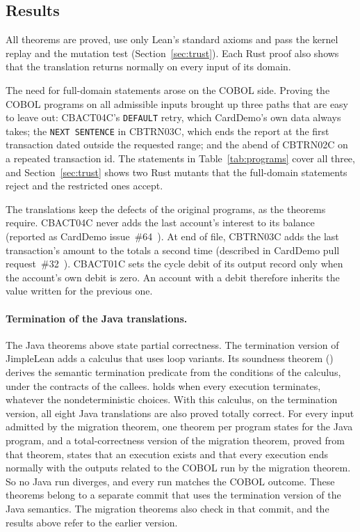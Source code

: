 \subsection{Results}

All \aTheorems{} theorems are proved, use only Lean's standard axioms and pass the kernel replay and the mutation test
(Section~\ref{sec:trust}). Each Rust proof also shows that the translation returns normally on every input
of its domain.

The need for full-domain statements arose on the COBOL side. Proving the COBOL programs on all admissible inputs brought up three
paths that are easy to leave out: CBACT04C's \texttt{DEFAULT} retry, which CardDemo's own data always takes; the \texttt{NEXT SENTENCE} in CBTRN03C, which ends the report at the first transaction
dated outside the requested range; and the abend of CBTRN02C on a repeated transaction id. The statements in
Table~\ref{tab:programs} cover all three, and Section~\ref{sec:trust} shows two Rust mutants that the full-domain statements reject and the restricted ones
accept.

The translations keep the defects of the original programs, as the theorems require. CBACT04C never adds the last account's interest to its balance (reported as CardDemo
issue~\#64~\cite{carddemo64}). At end of file, CBTRN03C adds the last
transaction's amount to the totals a second time (described in CardDemo pull request~\#32~\cite{carddemo32}). CBACT01C sets the cycle debit of its output record only when the
account's own debit is zero. An account with a debit therefore inherits the value written for the previous one.

\paragraph{Termination of the Java translations.} The Java theorems above state partial correctness. The termination
version of JimpleLean adds a calculus that uses loop variants. Its soundness theorem
() derives the semantic termination predicate  from the conditions of the calculus,
under the contracts of the callees.  holds when every execution terminates, whatever the nondeterministic choices. With
this calculus, on the termination version, all eight Java translations are also proved totally correct. For every input admitted by the migration theorem, one theorem per program states  for the Java program, and a total-correctness version of the migration
theorem, proved from that theorem, states that an execution exists and that every execution ends normally with the outputs related to the COBOL run by the migration theorem. So no Java run diverges, and every run matches the COBOL outcome. These
theorems belong to a separate commit that uses the termination version of the Java semantics. The migration theorems also check
in that commit, and the results above refer to the earlier version.

